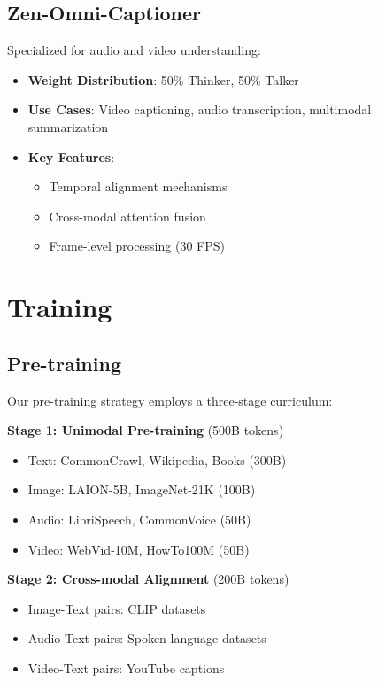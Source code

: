 \documentclass{article}
\begin{document}
\subsection{Zen-Omni-Captioner}

Specialized for audio and video understanding:

\begin{itemize}
    \item \textbf{Weight Distribution}: 50\% Thinker, 50\% Talker
    \item \textbf{Use Cases}: Video captioning, audio transcription, multimodal summarization
    \item \textbf{Key Features}:
    \begin{itemize}
        \item Temporal alignment mechanisms
        \item Cross-modal attention fusion
        \item Frame-level processing (30 FPS)
    \end{itemize}
\end{itemize}

\section{Training}

\subsection{Pre-training}

Our pre-training strategy employs a three-stage curriculum:

\textbf{Stage 1: Unimodal Pre-training} (500B tokens)
\begin{itemize}
    \item Text: CommonCrawl, Wikipedia, Books (300B)
    \item Image: LAION-5B, ImageNet-21K (100B)
    \item Audio: LibriSpeech, CommonVoice (50B)
    \item Video: WebVid-10M, HowTo100M (50B)
\end{itemize}

\textbf{Stage 2: Cross-modal Alignment} (200B tokens)
\begin{itemize}
    \item Image-Text pairs: CLIP datasets
    \item Audio-Text pairs: Spoken language datasets
    \item Video-Text pairs: YouTube captions
\end{itemize}
\end{document}
